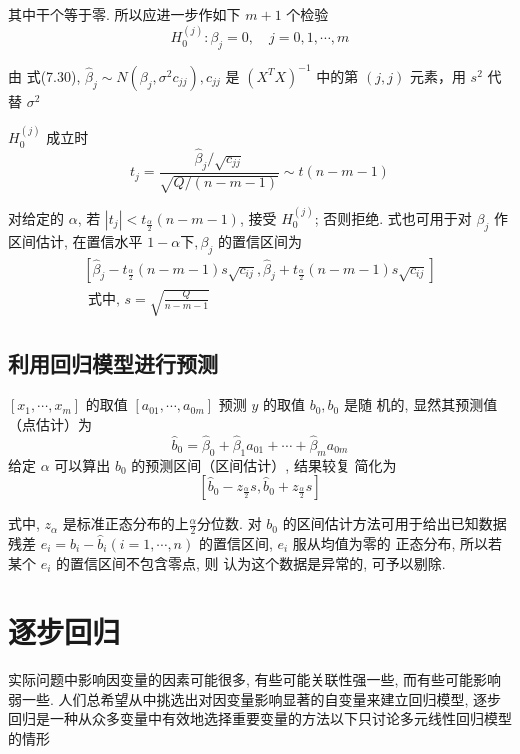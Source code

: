其中干个等于零. 所以应进一步作如下 \( {m}+{1} \) 个检验
$$H_{0}^{(j)}: \beta_{j}=0, \quad j=0,1, \cdots, m $$

由 式(7.30), $\hat{\beta}_{j} \sim N\left(\beta_{j}, \sigma^{2} c_{j j}\right), c_{j j}$  是 $\left(X^{T} X\right)^{-1}$  中的第 $ (j, j) $ 元素，用 $ s^{2} $ 代替 $ \sigma^{2} $


\( {H}_{0}^{(j)} \) 成立时
$$
t_{j}=\frac{\hat{\beta}_{j} / \sqrt{c_{j j}}}{\sqrt{Q /(n-m-1)}} \sim t(n-m-1)
$$

对给定的 $ \alpha $, 若 $ \left|t_{j}\right|<t_{\frac{\alpha}{2}}(n-m-1) $, 接受 $ H_{0}^{(j)} $; 否则拒绝.  式也可用于对 \( \beta_{j} \) 作区间估计, 在置信水平 \( 1-\alpha 下, \beta_{j} \) 的置信区间为
$$
\begin{array}{l}
{\left[\hat{\beta}_{j}-t_{\frac{\alpha}{2}}(n-m-1) s \sqrt{c_{i j}}, \hat{\beta}_{j}+t_{\frac{\alpha}{2}}(n-m-1) s \sqrt{c_{i j}}\right]} \\
\text { 式中, } s=\sqrt{\frac{Q}{n-m-1}} 
\end{array}
$$

\subsection{利用回归模型进行预测}

\( \left[x_{1}, \cdots, x_{m}\right] \) 的取值 \( \left[a_{01}, \cdots, a_{0 m}\right] \) 预测 \( y \) 的取值 \( b_{0}, b_{0} \) 是随 机的, 显然其预测值（点估计）为
$$
\hat{b}_{0}=\hat{\beta}_{0}+\hat{\beta}_{1} a_{01}+\cdots+\hat{\beta}_{m} a_{0 m} 
$$
给定 \( \alpha \) 可以算出 \( {b}_{{0}} \) 的预测区间（区间估计）, 结果较复
简化为
$$
\left[\hat{b}_{0}-z_{\frac{\alpha}{2}} s, \hat{b}_{0}+z_{\frac{\alpha}{2}} s\right]
$$

式中, \( {z}_{\alpha} \) 是标准正态分布的上$\frac{\alpha}{2} $分位数. 
对 \( {b}_{0} \) 的区间估计方法可用于给出已知数据残差 \( {e}_{i}={b}_{{i}}-\hat{{b}}_{{i}}({i}={1}, \cdots, {n}) \) 的置信区间, \( {e}_{i} \) 服从均值为零的
正态分布, 所以若某个 \( e_{i} \) 的置信区间不包含零点, 则 认为这个数据是异常的, 可予以剔除. 

\section{逐步回归}

实际问题中影响因变量的因素可能很多, 有些可能关联性强一些, 而有些可能影响弱一些. 人们总希望从中挑选出对因变量影响显著的自变量来建立回归模型, 逐步回归是一种从众多变量中有效地选择重要变量的方法以下只讨论多元线性回归模型的情形

